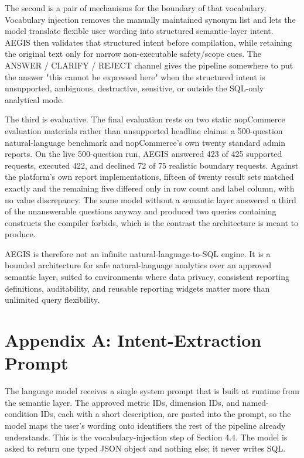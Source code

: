 \documentclass[pdflatex,sn-mathphys-num]{sn-jnl}
\begin{document}
The second is a pair of mechanisms for the boundary of that vocabulary. Vocabulary injection removes the manually maintained synonym list and lets the model translate flexible user wording into structured semantic-layer intent. AEGIS then validates that structured intent before compilation, while retaining the original text only for narrow non-executable safety/scope cues. The ANSWER / CLARIFY / REJECT channel gives the pipeline somewhere to put the answer "this cannot be expressed here" when the structured intent is unsupported, ambiguous, destructive, sensitive, or outside the SQL-only analytical mode.


The third is evaluative. The final evaluation rests on two static nopCommerce evaluation materials rather than unsupported headline claims: a 500-question natural-language benchmark and nopCommerce's own twenty standard admin reports. On the live 500-question run, AEGIS answered 423 of 425 supported requests, executed 422, and declined 72 of 75 realistic boundary requests. Against the platform's own report implementations, fifteen of twenty result sets matched exactly and the remaining five differed only in row count and label column, with no value discrepancy. The same model without a semantic layer answered a third of the unanswerable questions anyway and produced two queries containing constructs the compiler forbids, which is the contrast the architecture is meant to produce.


AEGIS is therefore not an infinite natural-language-to-SQL engine. It is a bounded architecture for safe natural-language analytics over an approved semantic layer, suited to environments where data privacy, consistent reporting definitions, auditability, and reusable reporting widgets matter more than unlimited query flexibility.


\section{Appendix A: Intent-Extraction Prompt}

The language model receives a single system prompt that is built at runtime from the semantic layer. The approved metric IDs, dimension IDs, and named-condition IDs, each with a short description, are pasted into the prompt, so the model maps the user's wording onto identifiers the rest of the pipeline already understands. This is the vocabulary-injection step of Section 4.4. The model is asked to return one typed JSON object and nothing else; it never writes SQL.
\end{document}
